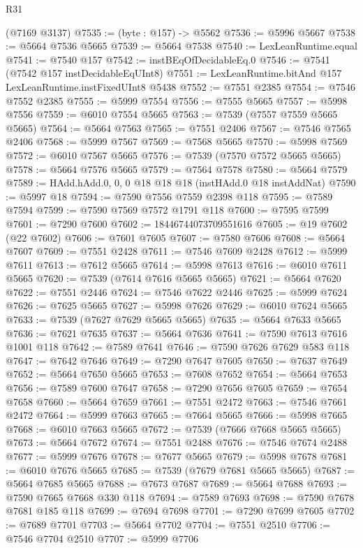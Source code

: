 \begin{lexlean}{R31}
\begin{coremodule}
    (@7169 @3137)
@7535 := (byte : @157) -> @5562
@7536 := @5996 @5667
@7538 := @5664 @7536 @5665
@7539 := @5664 @7538
@7540 := LexLeanRuntime.equal
@7541 := @7540 @157
@7542 := instBEqOfDecidableEq.{0}
@7546 := @7541 (@7542 @157 instDecidableEqUInt8)
@7551 := LexLeanRuntime.bitAnd @157 LexLeanRuntime.instFixedUInt8 @5438
@7552 := @7551 @2385
@7554 := @7546 @7552 @2385
@7555 := @5999 @7554
@7556 := @7555 @5665
@7557 := @5998 @7556
@7559 := @6010 @7554 @5665
@7563 := @7539 (@7557 @7559 @5665 @5665)
@7564 := @5664 @7563
@7565 := @7551 @2406
@7567 := @7546 @7565 @2406
@7568 := @5999 @7567
@7569 := @7568 @5665
@7570 := @5998 @7569
@7572 := @6010 @7567 @5665
@7576 := @7539 (@7570 @7572 @5665 @5665)
@7578 := @5664 @7576 @5665
@7579 := @7564 @7578
@7580 := @5664 @7579
@7589 := HAdd.hAdd.{0, 0, 0} @18 @18 @18 (instHAdd.{0} @18 instAddNat)
@7590 := @5997 @18
@7594 := @7590 @7556 @7559 @2398 @118
@7595 := @7589 @7594
@7599 := @7590 @7569 @7572 @1791 @118
@7600 := @7595 @7599
@7601 := @7290 @7600
@7602 := 18446744073709551616
@7605 := @19 @7602 (@22 @7602)
@7606 := @7601 @7605
@7607 := @7580 @7606
@7608 := @5664 @7607
@7609 := @7551 @2428
@7611 := @7546 @7609 @2428
@7612 := @5999 @7611
@7613 := @7612 @5665
@7614 := @5998 @7613
@7616 := @6010 @7611 @5665
@7620 := @7539 (@7614 @7616 @5665 @5665)
@7621 := @5664 @7620
@7622 := @7551 @2446
@7624 := @7546 @7622 @2446
@7625 := @5999 @7624
@7626 := @7625 @5665
@7627 := @5998 @7626
@7629 := @6010 @7624 @5665
@7633 := @7539 (@7627 @7629 @5665 @5665)
@7635 := @5664 @7633 @5665
@7636 := @7621 @7635
@7637 := @5664 @7636
@7641 := @7590 @7613 @7616 @1001 @118
@7642 := @7589 @7641
@7646 := @7590 @7626 @7629 @583 @118
@7647 := @7642 @7646
@7649 := @7290 @7647 @7605
@7650 := @7637 @7649
@7652 := @5664 @7650 @5665
@7653 := @7608 @7652
@7654 := @5664 @7653
@7656 := @7589 @7600 @7647
@7658 := @7290 @7656 @7605
@7659 := @7654 @7658
@7660 := @5664 @7659
@7661 := @7551 @2472
@7663 := @7546 @7661 @2472
@7664 := @5999 @7663
@7665 := @7664 @5665
@7666 := @5998 @7665
@7668 := @6010 @7663 @5665
@7672 := @7539 (@7666 @7668 @5665 @5665)
@7673 := @5664 @7672
@7674 := @7551 @2488
@7676 := @7546 @7674 @2488
@7677 := @5999 @7676
@7678 := @7677 @5665
@7679 := @5998 @7678
@7681 := @6010 @7676 @5665
@7685 := @7539 (@7679 @7681 @5665 @5665)
@7687 := @5664 @7685 @5665
@7688 := @7673 @7687
@7689 := @5664 @7688
@7693 := @7590 @7665 @7668 @330 @118
@7694 := @7589 @7693
@7698 := @7590 @7678 @7681 @185 @118
@7699 := @7694 @7698
@7701 := @7290 @7699 @7605
@7702 := @7689 @7701
@7703 := @5664 @7702
@7704 := @7551 @2510
@7706 := @7546 @7704 @2510
@7707 := @5999 @7706

\end{coremodule}
\end{lexlean}
